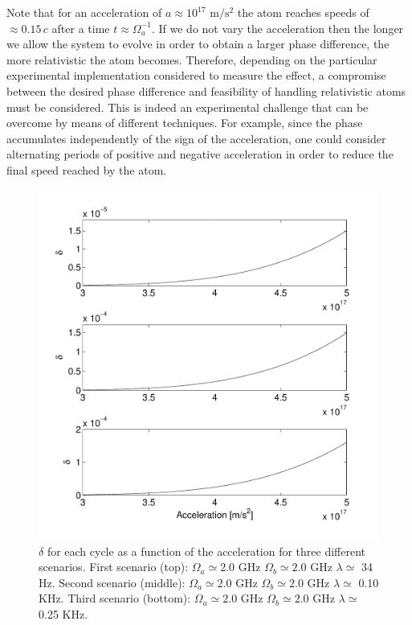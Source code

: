 Note that for an acceleration of $a\approx 10^{17}$ $\text{m}/\text{s}^2$ the atom reaches speeds of $\approx 0.15\,c$ after a time $t\approx \Omega_a^{-1}$. 
If we do not vary the acceleration then the longer we allow the system to evolve in order to obtain a larger phase difference, the more relativistic the atom becomes. Therefore,  depending on the particular experimental implementation considered to measure the effect, a compromise between the desired phase difference and feasibility of handling relativistic atoms must be considered.  This is indeed an experimental challenge that can be overcome by means of different techniques. For example,  since the phase accumulates independently of the sign of the acceleration, one could consider alternating periods of positive and negative acceleration in order to reduce the final speed reached by the atom. 
\begin{figure}[h]
\begin{center}
\includegraphics[width=.75\textwidth]{deph}
\caption{$\delta$ for each cycle as a function of the acceleration for three different scenarios. First scenario (top): $\Omega_a\simeq 2.0$ GHz  $\Omega_b\simeq 2.0$ GHz $\lambda\simeq$ 34  Hz.
Second scenario (middle): $\Omega_a\simeq 2.0$ GHz  $\Omega_b\simeq 2.0$ GHz  $\lambda\simeq$  0.10  KHz.
Third scenario (bottom): $\Omega_a\simeq 2.0$ GHz  $\Omega_b\simeq 2.0$ GHz  $\lambda\simeq$ 0.25  KHz.}
\label{deph}
\end{center}
\end{figure}


